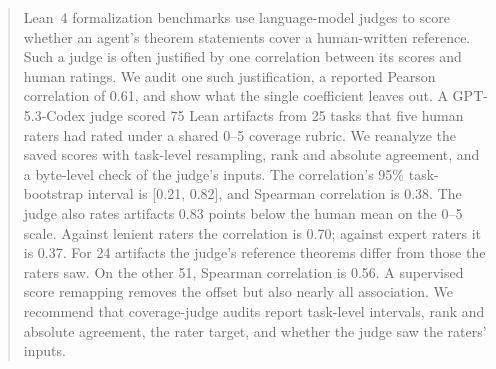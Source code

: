 \begin{abstract}
Lean~4 formalization benchmarks use language-model judges to score whether an agent's theorem statements cover a human-written reference.
Such a judge is often justified by one correlation between its scores and human ratings.
We audit one such justification, a reported Pearson correlation of 0.61, and show what the single coefficient leaves out.
A GPT-5.3-Codex judge scored 75 Lean artifacts from 25 tasks that five human raters had rated under a shared 0--5 coverage rubric.
We reanalyze the saved scores with task-level resampling, rank and absolute agreement, and a byte-level check of the judge's inputs.
The correlation's 95\% task-bootstrap interval is [0.21, 0.82], and Spearman correlation is 0.38.
The judge also rates artifacts 0.83 points below the human mean on the 0--5 scale.
Against lenient raters the correlation is 0.70; against expert raters it is 0.37.
For 24 artifacts the judge's reference theorems differ from those the raters saw.
On the other 51, Spearman correlation is 0.56.
A supervised score remapping removes the offset but also nearly all association.
We recommend that coverage-judge audits report task-level intervals, rank and absolute agreement, the rater target, and whether the judge saw the raters' inputs.
\end{abstract}
